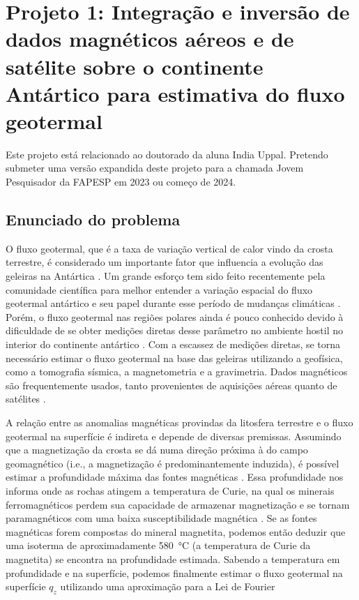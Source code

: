 \documentclass[12pt,a4paper,oneside]{book}
\begin{document}
\section{%
  Projeto 1: Integração e inversão de dados magnéticos aéreos e de satélite
  sobre o continente Antártico para estimativa do fluxo geotermal
}

Este projeto está relacionado ao doutorado da aluna India Uppal. Pretendo
submeter uma versão expandida deste projeto para a chamada Jovem Pesquisador da
FAPESP em 2023 ou começo de 2024.

\subsection{Enunciado do problema}

O fluxo geotermal, que é a taxa de variação vertical de calor vindo da
crosta terrestre, é considerado um importante fator que influencia a evolução
das geleiras na Antártica \citep{Seroussi2017}.
Um grande esforço tem sido feito recentemente pela comunidade científica para
melhor entender a variação espacial do fluxo geotermal antártico e seu papel
durante esse período de mudanças climáticas \citep{BurtonJohnson2020}.
Porém, o fluxo geotermal nas regiões polares ainda é pouco conhecido devido à
dificuldade de se obter medições diretas desse parâmetro no ambiente hostil no
interior do continente antártico \citep{BurtonJohnson2020}.
Com a escassez de medições diretas, se torna necessário estimar o fluxo
geotermal na base das geleiras utilizando a geofísica, como a tomografia
sísmica, a magnetometria e a gravimetria.
Dados magnéticos são frequentemente usados, tanto provenientes de aquisições
aéreas \citep[e.g.,][]{Lowe2023} quanto de satélites
\citep[e.g.,][]{FoxMaule2005}.

A relação entre as anomalias magnéticas provindas da litosfera terrestre e o
fluxo geotermal na superfície é indireta e depende de diversas premissas.
Assumindo que a magnetização da crosta se dá numa direção próxima à do campo
geomagnético (i.e., a magnetização é predominantemente induzida), é possível
estimar a profundidade máxima das fontes magnéticas \citep{Spector1970}.
Essa profundidade nos informa onde as rochas atingem a temperatura de Curie,
na qual os minerais ferromagnéticos perdem sua capacidade de armazenar
magnetização e se tornam paramagnéticos com uma baixa susceptibilidade
magnética \citep{Blakely1988}.
Se as fontes magnéticas forem compostas do mineral magnetita, podemos então
deduzir que uma isoterma de aproximadamente \qty{580}{\degreeCelsius} (a
temperatura de Curie da magnetita) se encontra na profundidade estimada.
Sabendo a temperatura em profundidade e na superfície, podemos finalmente
estimar o fluxo geotermal na superfície $q_z$ utilizando uma aproximação para a
Lei de Fourier
\end{document}
